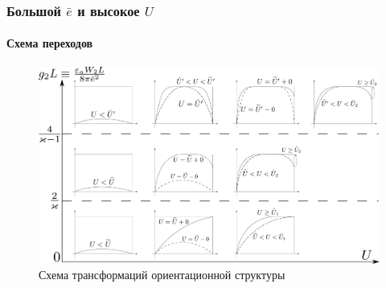 \documentclass[utf8,secheader]{beamer}
\begin{document}
%
%

\begin{frame}
\frametitle{Большой $\bar{e}$ и высокое $U$}
\framesubtitle{Схема переходов}
\begin{figure}
\includegraphics[width = \textwidth]{Scheme.png}
\caption{Схема трансформаций ориентационной структуры}
\end{figure}
\end{frame}
\end{document}
